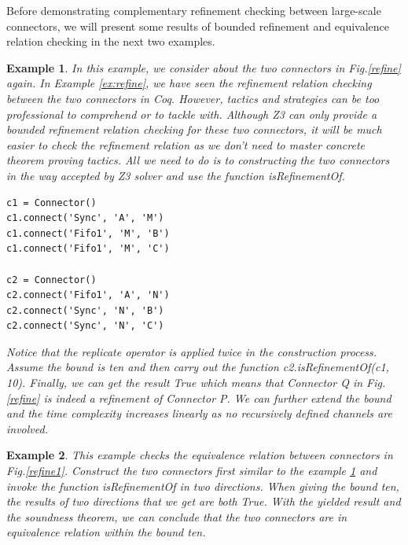 \documentclass[3p,times]{elsarticle}
\newtheorem{example}{Example}[section]
\begin{document}
Before demonstrating complementary refinement checking between large-scale connectors, we will present some results of bounded refinement and equivalence relation checking in the next two examples.
\begin{example}
\label{ex:equivalence1}
In this example, we consider about the two connectors in Fig.\ref{refine} again. In  Example \ref{ex:refine}, we have seen the refinement relation checking between the two connectors in Coq. However, tactics and strategies can be too professional to comprehend or to tackle with. Although Z3 can only provide a bounded refinement relation checking for these two connectors, it will be much easier to check the refinement relation as we don't need to master concrete theorem proving tactics. All we need to do is to constructing the two connectors in the way accepted by Z3 solver and use the function \emph{isRefinementOf}.
\begin{lstlisting}[frame=single]
c1 = Connector()
c1.connect('Sync', 'A', 'M')
c1.connect('Fifo1', 'M', 'B')
c1.connect('Fifo1', 'M', 'C')

c2 = Connector()
c2.connect('Fifo1', 'A', 'N')
c2.connect('Sync', 'N', 'B')
c2.connect('Sync', 'N', 'C')
\end{lstlisting}
Notice that the \emph{replicate} operator is applied twice in the construction process. Assume the bound is ten and then carry out the function \emph{c2.isRefinementOf(c1, 10)}. Finally, we can get the result \emph{True} which means that \emph{Connector Q} in Fig.\ref{refine} is indeed a refinement of \emph{Connector P}. We can further extend the bound and the time complexity increases linearly as no recursively defined channels are involved.
\end{example}
\begin{example}
This example checks the equivalence relation between connectors in Fig.\ref{refine1}. Construct the two connectors first similar to the example \ref{ex:equivalence1} and invoke the function \emph{isRefinementOf} in two directions.
When giving the bound ten, the results of two directions that we get are both \emph{True}. With the yielded result and the soundness theorem, we can conclude that the two connectors are in equivalence relation within the bound ten.
\end{example}
\end{document}
